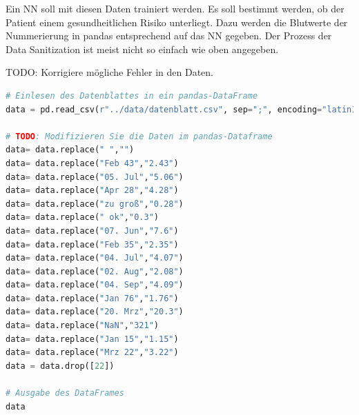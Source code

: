 \documentclass[a4paper,10pt,titlepage]{scrartcl}
\begin{document}
Ein NN soll mit diesen Daten trainiert werden. Es soll bestimmt werden, ob der Patient einem gesundheitlichen Risiko unterliegt. Dazu werden die Blutwerte der Nummerierung in pandas entsprechend auf das NN gegeben. Der Prozess der Data Sanitization ist meist nicht so einfach wie oben angegeben.

TODO: Korrigiere mögliche Fehler in den Daten.

\begin{lstlisting}[language=python]
# Einlesen des Datenblattes in ein pandas-DataFrame
data = pd.read_csv(r"../data/datenblatt.csv", sep=";", encoding="latin1")

# TODO: Modifizieren Sie die Daten im pandas-Dataframe
data= data.replace(" ","")
data= data.replace("Feb 43","2.43")
data= data.replace("05. Jul","5.06")
data= data.replace("Apr 28","4.28")
data= data.replace("zu groß","0.28")
data= data.replace(" ok","0.3")
data= data.replace("07. Jun","7.6")
data= data.replace("Feb 35","2.35")
data= data.replace("04. Jul","4.07")
data= data.replace("02. Aug","2.08")
data= data.replace("04. Sep","4.09")
data= data.replace("Jan 76","1.76")
data= data.replace("20. Mrz","20.3")
data= data.replace("NaN","321")
data= data.replace("Jan 15","1.15")
data= data.replace("Mrz 22","3.22")
data = data.drop([22])

# Ausgabe des DataFrames
data
\end{lstlisting}
\end{document}
